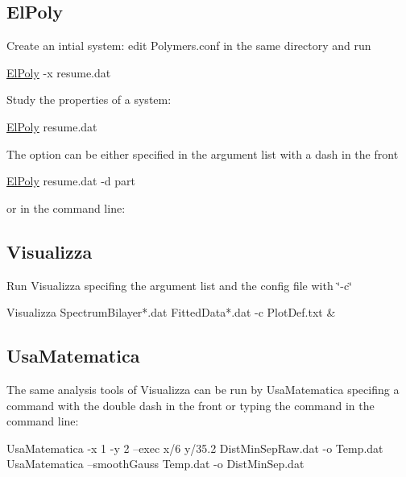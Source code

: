 \hypertarget{usage_page_ElPoly_section}{}\subsection{El\+Poly}\label{usage_page_ElPoly_section}
Create an intial system\+: edit Polymers.\+conf in the same directory and run 
\begin{DoxyCode}
\hyperlink{namespaceElPoly}{ElPoly} -x resume.dat
\end{DoxyCode}
 Study the properties of a system\+: 
\begin{DoxyCode}
\hyperlink{namespaceElPoly}{ElPoly} resume.dat
\end{DoxyCode}
 The option can be either specified in the argument list with a dash in the front 
\begin{DoxyCode}
\hyperlink{namespaceElPoly}{ElPoly} resume.dat -d part
\end{DoxyCode}
 or in the command line\+: 
\hypertarget{usage_page_Visualizza_section}{}\subsection{Visualizza}\label{usage_page_Visualizza_section}
Run Visualizza specifing the argument list and the config file with \char`\"{}-\/c\char`\"{} 
\begin{DoxyCode}
Visualizza SpectrumBilayer*.dat FittedData*.dat -c PlotDef.txt &
\end{DoxyCode}
\hypertarget{usage_page_UsaMatematica_section}{}\subsection{Usa\+Matematica}\label{usage_page_UsaMatematica_section}
The same analysis tools of Visualizza can be run by Usa\+Matematica specifing a command with the double dash in the front or typing the command in the command line\+: 
\begin{DoxyCode}
UsaMatematica -x 1 -y 2 --exec x/6 y/35.2  DistMinSepRaw.dat -o Temp.dat
UsaMatematica --smoothGauss Temp.dat -o DistMinSep.dat
\end{DoxyCode}
